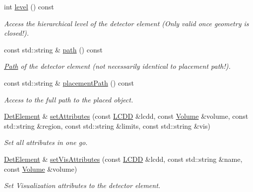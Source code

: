 \begin{DoxyCompactItemize}
int \hyperlink{class_d_d4hep_1_1_geometry_1_1_det_element_a240671f969600e1f707085d01fd62ec9}{level} () const 
\begin{DoxyCompactList}\small\item\em Access the hierarchical level of the detector element (Only valid once geometry is closed!). \item\end{DoxyCompactList}\item 
const std::string \& \hyperlink{class_d_d4hep_1_1_geometry_1_1_det_element_a6b70a5084294e7adb2f0bd0018e3aed2}{path} () const 
\begin{DoxyCompactList}\small\item\em \hyperlink{class_d_d4hep_1_1_path}{Path} of the detector element (not necessarily identical to placement path!). \item\end{DoxyCompactList}\item 
const std::string \& \hyperlink{class_d_d4hep_1_1_geometry_1_1_det_element_a0616a56e3d6ac4039041361d533de8ee}{placementPath} () const 
\begin{DoxyCompactList}\small\item\em Access to the full path to the placed object. \item\end{DoxyCompactList}\item 
\hyperlink{class_d_d4hep_1_1_geometry_1_1_det_element}{DetElement} \& \hyperlink{class_d_d4hep_1_1_geometry_1_1_det_element_a08aef0534eb91ede146a6b17ac4f0fa8}{setAttributes} (const \hyperlink{class_d_d4hep_1_1_geometry_1_1_l_c_d_d}{LCDD} \&lcdd, const \hyperlink{class_d_d4hep_1_1_geometry_1_1_volume}{Volume} \&volume, const std::string \&region, const std::string \&limits, const std::string \&vis)
\begin{DoxyCompactList}\small\item\em Set all attributes in one go. \item\end{DoxyCompactList}\item 
\hyperlink{class_d_d4hep_1_1_geometry_1_1_det_element}{DetElement} \& \hyperlink{class_d_d4hep_1_1_geometry_1_1_det_element_acdd370a4a20bc97cc7d9534f5e1fe91b}{setVisAttributes} (const \hyperlink{class_d_d4hep_1_1_geometry_1_1_l_c_d_d}{LCDD} \&lcdd, const std::string \&name, const \hyperlink{class_d_d4hep_1_1_geometry_1_1_volume}{Volume} \&volume)
\begin{DoxyCompactList}\small\item\em Set Visualization attributes to the detector element. \item\end{DoxyCompactList}\item 

\end{DoxyCompactItemize}
